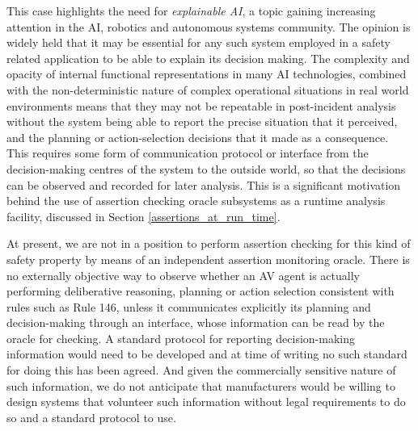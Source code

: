 This case highlights the need for \emph{explainable AI}, a topic gaining increasing attention in the AI, robotics and autonomous systems community. The opinion is widely held \cite{deeks2019judicial, o2019legal, wortham2020transparency} that it may be essential for any such system employed in a safety related application to be able to explain its decision making. The complexity and opacity of internal functional representations in many AI technologies, combined with the non-deterministic nature of complex operational situations in real world environments means that they may not be repeatable in post-incident analysis without the system being able to report the precise situation that it perceived, and the planning or action-selection decisions that it made as a consequence. This requires some form of communication protocol or interface from the decision-making centres of the system to the outside world, so that the decisions can be observed and recorded for later analysis. This is a significant motivation behind the use of assertion checking oracle subsystems as a runtime analysis facility, discussed in Section \ref{assertions_at_run_time}.

At present, we are not in a position to perform assertion checking for this kind of safety property by means of an independent assertion monitoring oracle. There is no externally objective way to observe whether an AV agent is actually performing deliberative reasoning, planning or action selection consistent with rules such as Rule 146, unless it communicates explicitly its planning and decision-making through an interface, whose information can be read by the oracle for checking. A standard protocol for reporting decision-making information would need to be developed and at time of writing no such standard for doing this has been agreed. And given the commercially sensitive nature of such information, we do not anticipate that manufacturers would be willing to design systems that volunteer such information without legal requirements to do so and a standard protocol to use.

